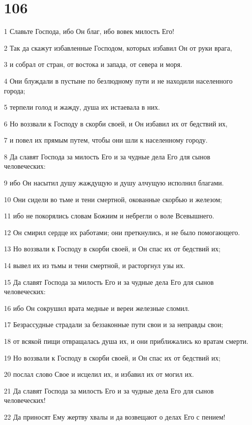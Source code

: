 \chapter{106}

\par 1 Славьте Господа, ибо Он благ, ибо вовек милость Его!
\par 2 Так да скажут избавленные Господом, которых избавил Он от руки врага,
\par 3 и собрал от стран, от востока и запада, от севера и моря.
\par 4 Они блуждали в пустыне по безлюдному пути и не находили населенного города;
\par 5 терпели голод и жажду, душа их истаевала в них.
\par 6 Но воззвали к Господу в скорби своей, и Он избавил их от бедствий их,
\par 7 и повел их прямым путем, чтобы они шли к населенному городу.
\par 8 Да славят Господа за милость Его и за чудные дела Его для сынов человеческих:
\par 9 ибо Он насытил душу жаждущую и душу алчущую исполнил благами.
\par 10 Они сидели во тьме и тени смертной, окованные скорбью и железом;
\par 11 ибо не покорялись словам Божиим и небрегли о воле Всевышнего.
\par 12 Он смирил сердце их работами; они преткнулись, и не было помогающего.
\par 13 Но воззвали к Господу в скорби своей, и Он спас их от бедствий их;
\par 14 вывел их из тьмы и тени смертной, и расторгнул узы их.
\par 15 Да славят Господа за милость Его и за чудные дела Его для сынов человеческих:
\par 16 ибо Он сокрушил врата медные и вереи железные сломил.
\par 17 Безрассудные страдали за беззаконные пути свои и за неправды свои;
\par 18 от всякой пищи отвращалась душа их, и они приближались ко вратам смерти.
\par 19 Но воззвали к Господу в скорби своей, и Он спас их от бедствий их;
\par 20 послал слово Свое и исцелил их, и избавил их от могил их.
\par 21 Да славят Господа за милость Его и за чудные дела Его для сынов человеческих!
\par 22 Да приносят Ему жертву хвалы и да возвещают о делах Его с пением!
